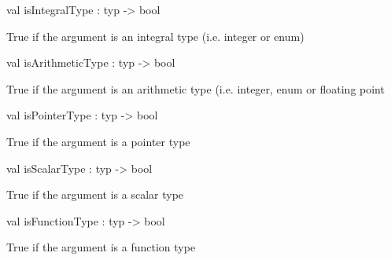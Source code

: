 \documentclass[11pt]{article}
\begin{document}
\label{val:Cil.isIntegralType}\begin{ocamldoccode}
val isIntegralType : typ -> bool
\end{ocamldoccode}
\begin{ocamldocdescription}
True if the argument is an integral type (i.e. integer or enum)


\end{ocamldocdescription}




\label{val:Cil.isArithmeticType}\begin{ocamldoccode}
val isArithmeticType : typ -> bool
\end{ocamldoccode}
\begin{ocamldocdescription}
True if the argument is an arithmetic type (i.e. integer, enum or 
    floating point


\end{ocamldocdescription}




\label{val:Cil.isPointerType}\begin{ocamldoccode}
val isPointerType : typ -> bool
\end{ocamldoccode}
\begin{ocamldocdescription}
True if the argument is a pointer type


\end{ocamldocdescription}




\label{val:Cil.isScalarType}\begin{ocamldoccode}
val isScalarType : typ -> bool
\end{ocamldoccode}
\begin{ocamldocdescription}
True if the argument is a scalar type


\end{ocamldocdescription}




\label{val:Cil.isFunctionType}\begin{ocamldoccode}
val isFunctionType : typ -> bool
\end{ocamldoccode}
\begin{ocamldocdescription}
True if the argument is a function type


\end{ocamldocdescription}
\end{document}
